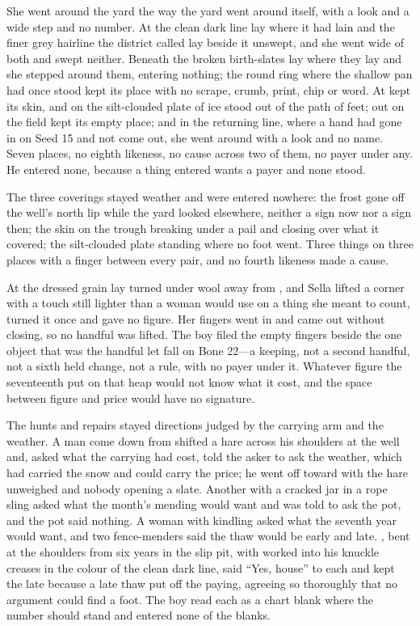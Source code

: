 She went around the yard the way the yard went around itself, with a look and a wide step and no number. At  the clean dark line lay where it had lain and the finer grey hairline the district called  lay beside it unswept, and she went wide of both and swept neither. Beneath  the broken birth-slates lay where they lay and she stepped around them, entering nothing; the round ring where the shallow pan had once stood kept its place with no scrape, crumb, print, chip or word. At   kept its skin, and on  the silt-clouded plate of ice stood out of the path of feet; out on  the field kept its empty place; and in the returning line, where a hand had gone in on Seed 15 and not come out, she went around with a look and no name. Seven places, no eighth likeness, no cause across two of them, no payer under any. He entered none, because a thing entered wants a payer and none stood.

The three coverings stayed weather and were entered nowhere: the frost gone off the well's north lip while the yard looked elsewhere, neither a sign now nor a sign then; the skin on the trough breaking under a pail and closing over what it covered; the silt-clouded plate standing where no foot went. Three things on three places with a finger between every pair, and no fourth likeness made a cause.

At  the dressed grain lay turned under wool away from , and Sella lifted a corner with a touch still lighter than a woman would use on a thing she meant to count, turned it once and gave no figure. Her fingers went in and came out without closing, so no handful was lifted. The boy filed the empty fingers beside the one object that was the handful let fall on Bone 22---a keeping, not a second handful, not a sixth held change, not a rule, with no payer under it. Whatever figure the seventeenth put on that heap would not know what it cost, and the space between figure and price would have no signature.

The hunts and repairs stayed directions judged by the carrying arm and the weather. A man come down from  shifted a hare across his shoulders at the well and, asked what the carrying had cost, told the asker to ask the weather, which had carried the snow and could carry the price; he went off toward  with the hare unweighed and nobody opening a slate. Another with a cracked jar in a rope sling asked what the month's mending would want and was told to ask the pot, and the pot said nothing. A woman with kindling asked what the seventh year would want, and two fence-menders said the thaw would be early and late. , bent at the shoulders from six years in the slip pit, with  worked into his knuckle creases in the colour of the clean dark line, said “Yes, house” to each and kept the late because a late thaw put off the paying, agreeing so thoroughly that no argument could find a foot. The boy read each as a chart blank where the number should stand and entered none of the blanks.

